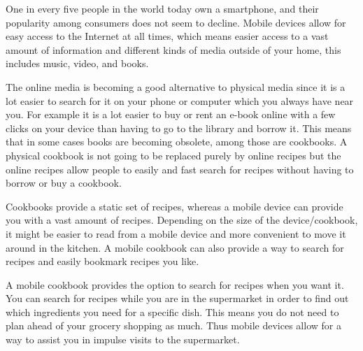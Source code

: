 One in every five people in the world today own a smartphone\cite{peoplesmartphones}, and their popularity among consumers does not seem to decline\citep{mobilegrow}. Mobile devices allow for easy access to the Internet at all times, which means easier access to a vast amount of information and different kinds of media outside of your home, this includes music, video, and books.

The online media is becoming a good alternative to physical media since it is a lot easier to search for it on your phone or computer which you always have near you. 
For example it is a lot easier to buy or rent an e-book online with a few clicks on your device than having to go to the library and borrow it. 
This means that in some cases books are becoming obsolete, among those are cookbooks. 
A physical cookbook is not going to be replaced purely by online recipes but the online recipes allow people to easily and fast search for recipes without having to borrow or buy a cookbook.

Cookbooks provide a static set of recipes, whereas a mobile device can provide you with a vast amount of recipes. Depending on the size of the device/cookbook, it might be easier to read from a mobile device and more convenient to move it around in the kitchen. A mobile cookbook can also provide a way to search for recipes and easily bookmark recipes you like.

A mobile cookbook provides the option to search for recipes when you want it. You can search for recipes while you are in the supermarket in order to find out which ingredients you need for a specific dish. This means you do not need to plan ahead of your grocery shopping as much. Thus mobile devices allow for a way to assist you in impulse visits to the supermarket.
